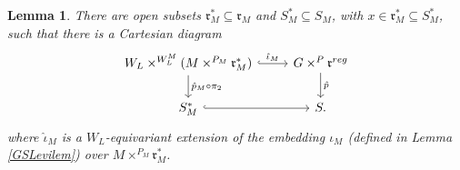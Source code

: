 \documentclass{amsart}
\newtheorem{lemma}[theorem]{Lemma}
\theoremstyle{remark}
\numberwithin{theorem}{section}
\numberwithin{equation}{section}
\begin{document}
\begin{lemma}\label{GSLeviCartesianlem}
There are open subsets $\mathfrak{r}_M^* \subseteq \mathfrak{r}_M$ and $S^*_M \subseteq S_M$, with $x \in \mathfrak{r}_M^* \subseteq S_M^*$, such that there is a Cartesian diagram
\begin{equation}\label{GSLeviCartesian1eqn}
\begin{tikzcd}
W_L \times^{W^M_L} (M \times^{P_M} \mathfrak{r}_M^*) \arrow[r, "\hat{\iota}_M", hook] \arrow[d, "\hat{p}_M \circ \pi_2"] & G \times^P \mathfrak{r}^{reg} \arrow[d, "\hat{p}"] \\
S^*_M \arrow[r, hook]                                                                                 & S.                                  
\end{tikzcd}
    \end{equation}
where $\hat{\iota}_M$ is a $W_L$-equivariant extension of the embedding $\iota_M$ (defined in Lemma \ref{GSLevilem}) over $M \times^{P_M} \mathfrak{r}_M^*$.
\end{lemma}
\end{document}
